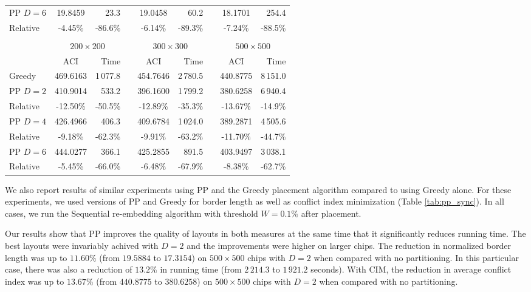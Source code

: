 \begin{table}[t!]
{\begin{tabular}{lcrlcrlcr}
\hline
PP $D=6$ &  19.8459 &  23.3   & &  19.0458 &  60.2   & &  18.1701 &    254.4   \\
Relative &  -4.45\% & -86.6\% & &  -6.14\% & -89.3\% & &  -7.24\% &    -88.5\% \\
\hline
\\
\vspace{1pt}
 & \multicolumn{2}{c}{$200\times 200$} & & \multicolumn{2}{c}{$300\times 300$} & & \multicolumn{2}{c}{$500\times 500$} \\
\cline{2-3} \cline{5-6} \cline{8-9}
\vspace{1pt}
         & ACI      & Time       & & ACI      & Time       & & ACI      & Time       \\
\hline
Greedy   & 469.6163 & 1\,077.8   & & 454.7646 & 2\,780.5   & & 440.8775 & 8\,151.0   \\
\hline
PP $D=2$ & 410.9014 &    533.2   & & 396.1600 & 1\,799.2   & & 380.6258 & 6\,940.4   \\
Relative & -12.50\% &    -50.5\% & & -12.89\% &    -35.3\% & & -13.67\% &    -14.9\% \\
\hline
PP $D=4$ & 426.4966 &    406.3   & & 409.6784 & 1\,024.0   & & 389.2871 & 4\,505.6   \\
Relative &  -9.18\% &    -62.3\% & &  -9.91\% &    -63.2\% & & -11.70\% &    -44.7\% \\
\hline
PP $D=6$ & 444.0277 &    366.1   & & 425.2855 &    891.5   & & 403.9497 & 3\,038.1   \\
Relative &  -5.45\% &    -66.0\% & &  -6.48\% &    -67.9\% & &  -8.38\% &    -62.7\% \\
\hline
\end{tabular}}
\end{table}

We also report results of similar experiments using PP and the Greedy placement
algorithm compared to using Greedy alone. For these experiments, we used
versions of PP and Greedy for border length as well as conflict index
minimization (Table \ref{tab:pp_sync}). In all cases, we run the Sequential
re-embedding algorithm with threshold $W=0.1\%$ after placement.

Our results show that PP improves the quality of layouts in both measures at the
same time that it significantly reduces running time. The best layouts were
invariably achived with $D=2$ and the improvements were higher on larger chips.
The reduction in normalized border length was up to $11.60\%$ (from $19.5884$ to
$17.3154$) on $500\times 500$ chips with $D=2$ when compared with no
partitioning. In this particular case, there was also a reduction of $13.2\%$ in
running time (from $2\,214.3$ to $1\,921.2$ seconds). With CIM, the reduction in
average conflict index was up to $13.67\%$ (from $440.8775$ to $380.6258$) on
$500\times 500$ chips with $D=2$ when compared with no partitioning.

